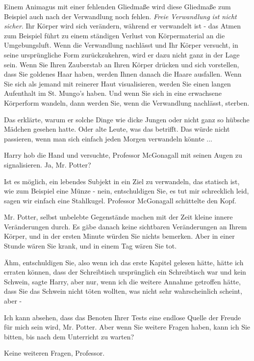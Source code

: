Einem Animagus mit einer fehlenden Gliedmaße wird diese Gliedmaße zum Beispiel
auch nach der Verwandlung noch fehlen. \emph{Freie Verwandlung ist nicht
sicher}. Ihr Körper wird sich verändern, während er verwandelt ist - das Atmen
zum Beispiel führt zu einem ständigen Verlust von Körpermaterial an die
Umgebungsluft. Wenn die Verwandlung nachlässt und Ihr Körper versucht, in seine
ursprüngliche Form zurückzukehren, wird er dazu nicht ganz in der Lage sein.
Wenn Sie Ihren Zauberstab an Ihren Körper drücken und sich vorstellen, dass Sie
goldenes Haar haben, werden Ihnen danach die Haare ausfallen. Wenn Sie sich als
jemand mit reinerer Haut visualisieren, werden Sie einen langen Aufenthalt im
St. Mungo's haben. Und wenn Sie sich in eine erwachsene Körperform wandeln, dann
werden Sie, wenn die Verwandlung nachlässt, sterben.\grqq{}

Das erklärte, warum er solche Dinge wie dicke Jungen oder nicht ganz so hübsche
Mädchen gesehen hatte. Oder alte Leute, was das betrifft. Das würde nicht
passieren, wenn man sich einfach jeden Morgen verwandeln könnte ...

Harry hob die Hand und versuchte, Professor McGonagall mit seinen Augen zu
signalisieren. \glqq{}Ja, Mr. Potter?\grqq{}

\glqq{}Ist es möglich, ein lebendes Subjekt in ein Ziel zu verwandeln, das
statisch ist, wie zum Beispiel eine Münze - nein, entschuldigen Sie, es tut mir
schrecklich leid, sagen wir einfach eine Stahlkugel.\grqq{} Professor McGonagall
schüttelte den Kopf.

\glqq{}Mr. Potter, selbst unbelebte Gegenstände machen mit der Zeit kleine innere
Veränderungen durch. Es gäbe danach keine sichtbaren Veränderungen an Ihrem
Körper, und in der ersten Minute würden Sie nichts bemerken. Aber in einer
Stunde wären Sie krank, und in einem Tag wären Sie tot.\grqq{}

\glqq{}Ähm, entschuldigen Sie, also wenn ich das erste Kapitel gelesen hätte,
hätte ich erraten können, dass der Schreibtisch ursprünglich ein Schreibtisch
war und kein Schwein\grqq{}, sagte Harry, \glqq{}aber nur, wenn ich die weitere
Annahme getroffen hätte, dass Sie das Schwein nicht töten wollten, was nicht
sehr wahrscheinlich scheint, aber -\grqq{}

\glqq{}Ich kann absehen, dass das Benoten Ihrer Tests eine endlose Quelle der
Freude für mich sein wird, Mr. Potter. Aber wenn Sie weitere Fragen haben, kann
ich Sie bitten, bis nach dem Unterricht zu warten?\grqq{}

\glqq{}Keine weiteren Fragen, Professor.\grqq{}

